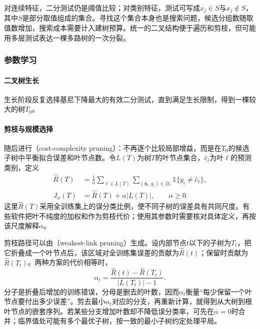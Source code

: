 对连续特征，二分测试仍是阈值比较；对类别特征，测试可写成$x_j\in S$与$x_j\notin S$，其中$S$是部分取值组成的集合。寻找这个集合本身也是搜索问题，候选分组数随取值数增加，搜索成本需要计入建树预算。统一的二叉结构便于遍历和剪枝，但可能用多层测试表达一棵多路树的一次分裂。

\subsubsection{参数学习}
\label{sec:classification-cart-learning}

\paragraph{二叉树生长}
生长阶段反复选择基尼下降最大的有效二分测试，直到满足生长限制，得到一棵较大的树$T_0$。

\paragraph{剪枝与规模选择}
随后进行（cost-complexity pruning）：不再逐个比较局部增益，而是在$T_0$的候选子树中平衡拟合误差和叶节点数。令$L(T)$为树$T$的叶节点集合，$\hat c_\ell$为叶$\ell$的预测类别，定义
\begin{align}
  \widehat R(T)
  &=\frac{1}{n}\sum_{\ell\in L(T)}
    \sum_{(\bm{x}_i,y_i)\in D_\ell}
    \mathbb{1}\{y_i\neq\hat c_\ell\},
  \label{eq:classification-cart-empirical-risk}\\
  J_\alpha(T)&=\widehat R(T)+\alpha|L(T)|,
  \qquad \alpha\geq0.
  \label{eq:classification-cart-cost-complexity}
\end{align}
这里$\widehat R(T)$采用全训练集上的误分类比例，使不同子树的误差具有共同尺度。有些软件把叶不纯度的加权和作为剪枝代价；使用其参数时需要核对具体定义，再按该尺度解释$\alpha$。

剪枝路径可以由（weakest-link pruning）生成。设内部节点$t$以下的子树为$T_t$，把它折叠成一个叶节点后，该区域对全训练集误差的贡献为$\widehat R(t)$；保留时贡献为$\widehat R(T_t)$。两种方案的代价相等时，
\begin{equation}
  \alpha_t=
  \frac{\widehat R(t)-\widehat R(T_t)}
       {|L(T_t)|-1}.
  \label{eq:classification-weakest-link}
\end{equation}
分子是折叠后增加的训练错误，分母是删去的叶数，因而$\alpha_t$衡量“每少保留一个叶节点要付出多少误差”。剪去最小$\alpha_t$对应的分支，再重新计算，就得到从大树到根叶节点的嵌套序列。若某些分支增加叶数却不降低误分类率，可先在$\alpha=0$时合并；临界值处可能有多个最优子树，按一致的最小子树约定处理平局。

